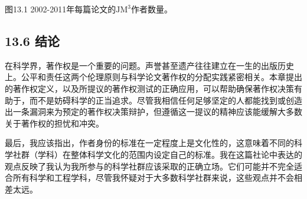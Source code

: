 图13.1 2002-2011年每篇论文的$\mathrm{JM}^{3}$作者数量。

\subsection*{13.6 结论}
在科学界，著作权是一个重要的问题。声誉甚至遗产往往建立在一生的出版历史上。公平和责任这两个伦理原则与科学论文著作权的分配实践紧密相关。本章提出的著作权定义，以及所提议的著作权测试的正确应用，可以帮助确保著作权决策有助于，而不是妨碍科学的正当追求。尽管我相信任何足够坚定的人都能找到或创造出一条漏洞来为预定的著作权决策辩护，但遵循这一提议的精神应该能缓解大多数关于著作权的担忧和冲突。

最后，我应该指出，作者身份的标准在一定程度上是文化性的，这意味着不同的科学社群（学科）在整体科学文化的范围内设定自己的标准。我在这篇社论中表达的观点反映了我认为我所参与的科学社群应该采取的正确立场。它们可能并不完全适合所有科学和工程学科，尽管我怀疑对于大多数科学社群来说，这些观点并不会相差太远。

